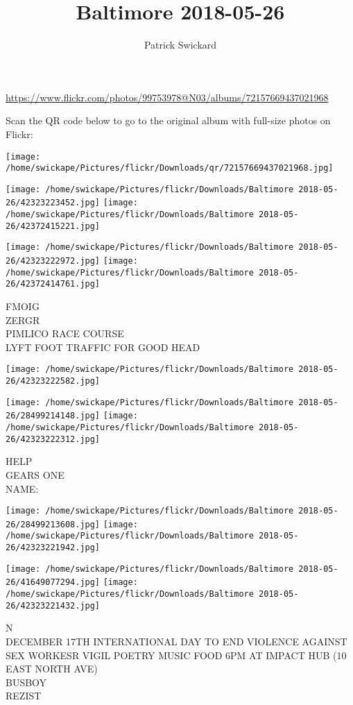 \documentclass[10pt,letterpaper]{article}
\title{Baltimore 2018-05-26}
\author{Patrick Swickard}
\date{}
\begin{document}
\maketitle

\url{https://www.flickr.com/photos/99753978@N03/albums/72157669437021968}

Scan the QR code below to go to the original album with full-size photos on Flickr:

\texttt{[image: /home/swickape/Pictures/flickr/Downloads/qr/72157669437021968.jpg]}
\pagebreak

\texttt{[image: /home/swickape/Pictures/flickr/Downloads/Baltimore 2018-05-26/42323223452.jpg]}
\texttt{[image: /home/swickape/Pictures/flickr/Downloads/Baltimore 2018-05-26/42372415221.jpg]}

\texttt{[image: /home/swickape/Pictures/flickr/Downloads/Baltimore 2018-05-26/42323222972.jpg]}
\texttt{[image: /home/swickape/Pictures/flickr/Downloads/Baltimore 2018-05-26/42372414761.jpg]}

FMOIG\\
ZERGR\\
PIMLICO RACE COURSE\\
LYFT FOOT TRAFFIC FOR GOOD HEAD
\pagebreak

\texttt{[image: /home/swickape/Pictures/flickr/Downloads/Baltimore 2018-05-26/42323222582.jpg]}

\vspace{0.25in}
\texttt{[image: /home/swickape/Pictures/flickr/Downloads/Baltimore 2018-05-26/28499214148.jpg]}
\texttt{[image: /home/swickape/Pictures/flickr/Downloads/Baltimore 2018-05-26/42323222312.jpg]}

HELP\\
GEARS ONE\\
NAME:
\pagebreak

\texttt{[image: /home/swickape/Pictures/flickr/Downloads/Baltimore 2018-05-26/28499213608.jpg]}
\texttt{[image: /home/swickape/Pictures/flickr/Downloads/Baltimore 2018-05-26/42323221942.jpg]}

\texttt{[image: /home/swickape/Pictures/flickr/Downloads/Baltimore 2018-05-26/41649077294.jpg]}
\texttt{[image: /home/swickape/Pictures/flickr/Downloads/Baltimore 2018-05-26/42323221432.jpg]}

N\\
DECEMBER 17TH INTERNATIONAL DAY TO END VIOLENCE AGAINST SEX WORKESR VIGIL POETRY MUSIC FOOD 6PM AT IMPACT HUB (10 EAST NORTH AVE)\\
BUSBOY\\
REZIST
\pagebreak
\end{document}
